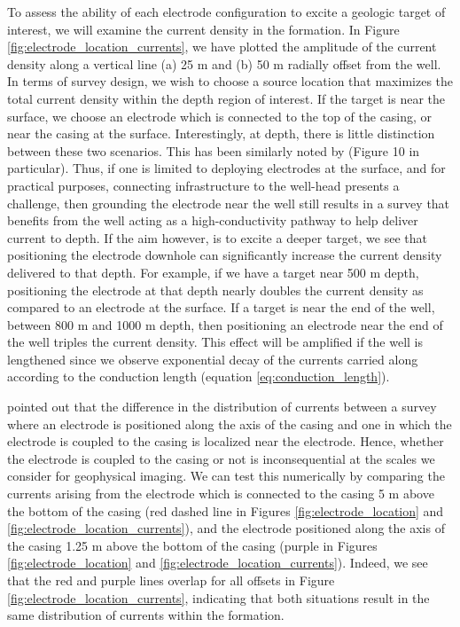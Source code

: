 \documentclass[extra,mreferee]{gji}
\begin{document}
To assess the ability of each electrode configuration to excite a geologic target of interest, we will examine the current density in the formation. In Figure \ref{fig:electrode_location_currents}, we have plotted the amplitude of the current density along a vertical line (a) 25 m and (b) 50 m radially offset from the well. In terms of survey design, we wish to choose a source location that maximizes the total current density within the depth region of interest. If the target is near the surface, we choose an electrode which is connected to the top of the casing, or near the casing at the surface. Interestingly, at depth, there is little distinction between these two scenarios. This has been similarly noted by \cite{Patzer2017} (Figure 10 in particular). Thus, if one is limited to deploying electrodes at the surface, and for practical purposes, connecting infrastructure to the well-head presents a challenge, then grounding the electrode near the well still results in a survey that benefits from the well acting as a high-conductivity pathway to help deliver current to depth. If the aim however, is to excite a deeper target, we see that positioning the electrode downhole can significantly increase the current density delivered to that depth. For example, if we have a target near 500 m depth, positioning the electrode at that depth nearly doubles the current density as compared to an electrode at the surface. If a target is near the end of the well, between 800 m and 1000 m depth, then positioning an electrode near the end of the well triples the current density. This effect will be amplified if the well is lengthened since we observe exponential decay of the currents carried along according to the conduction length (equation \ref{eq:conduction_length}).

\cite{Kaufman1990} pointed out that the difference in the distribution of currents between a survey where an electrode is positioned along the axis of the casing and one in which the electrode is coupled to the casing is localized near the electrode. Hence, whether the electrode is coupled to the casing or not is inconsequential at the scales we consider for geophysical imaging. We can test this numerically by comparing the currents arising from the electrode which is connected to the casing 5 m above the bottom of the casing (red dashed line in Figures \ref{fig:electrode_location} and \ref{fig:electrode_location_currents}), and the electrode positioned along the axis of the casing 1.25 m above the bottom of the casing (purple in Figures \ref{fig:electrode_location} and \ref{fig:electrode_location_currents}). Indeed, we see that the red and purple lines overlap for all offsets in Figure \ref{fig:electrode_location_currents}, indicating that both situations result in the same distribution of currents within the formation.
\end{document}
